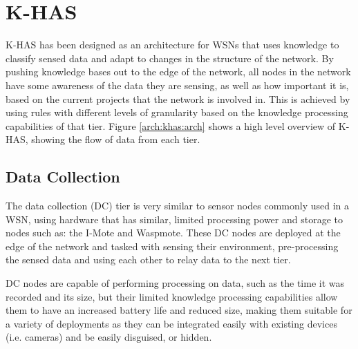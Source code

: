 	\section{K-HAS}\label{arch:khas}
		K-HAS has been designed as an architecture for WSNs that uses knowledge to classify sensed data and adapt to changes in the structure of the network. By pushing knowledge bases out to the edge of the network, all nodes in the network have some awareness of the data they are sensing, as well as how important it is, based on the current projects that the network is involved in. This is achieved by using rules with different levels of granularity based on the knowledge processing capabilities of that tier. Figure \ref{arch:khas:arch} shows a high level overview of K-HAS, showing the flow of data from each tier.
	
	
	\subsection{Data Collection}\label{khas:dc}
	The data collection (DC) tier is very similar to sensor nodes commonly used in a WSN, using hardware that has similar, limited processing power and storage to nodes such as: the I-Mote and Waspmote. These DC nodes are deployed at the edge of the network and tasked with sensing their environment, pre-processing the sensed data and using each other to relay data to the next tier.

	DC nodes are capable of performing processing on data, such as the time it was recorded and its size, but their limited knowledge processing capabilities allow them to have an increased battery life and reduced size, making them suitable for a variety of deployments as they can be integrated easily with existing devices (i.e. cameras) and be easily disguised, or hidden.

